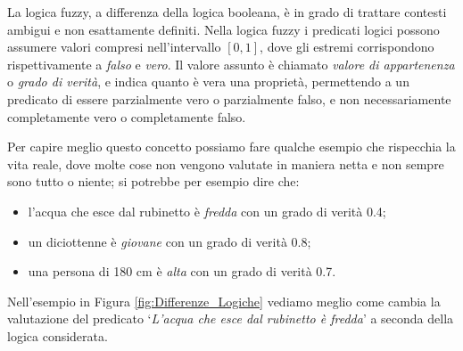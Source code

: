 \documentclass[a4paper,12pt]{report}
\begin{document}
La logica fuzzy, a differenza della logica booleana, è in grado di trattare contesti ambigui e non esattamente definiti.
Nella logica fuzzy i predicati logici possono assumere valori compresi nell'intervallo $[0,1]$, dove gli estremi corrispondono rispettivamente a \textit{falso} e \textit{vero}.
Il valore assunto è chiamato \textit{valore di appartenenza} o \textit{grado di verità}, e indica quanto è vera una proprietà, permettendo a un predicato di essere parzialmente vero o parzialmente falso, e non necessariamente completamente vero o completamente falso.

\bigskip

Per capire meglio questo concetto possiamo fare qualche esempio che rispecchia la vita reale, dove molte cose non vengono valutate in maniera netta e non sempre sono tutto o niente; si potrebbe per esempio dire che:


\begin{itemize}
    \item l'acqua che esce dal rubinetto è  \textit{fredda} con un grado di verità 0.4;
    \item un diciottenne è \textit{giovane} con un grado di verità 0.8;
    \item una persona di 180 cm è \textit{alta} con un grado di verità 0.7.
\end{itemize}

\noindent Nell'esempio in Figura \ref{fig:Differenze_Logiche} vediamo meglio come cambia la valutazione del predicato `\textit{L'acqua che esce dal rubinetto è fredda}' a seconda della logica considerata.
\end{document}
